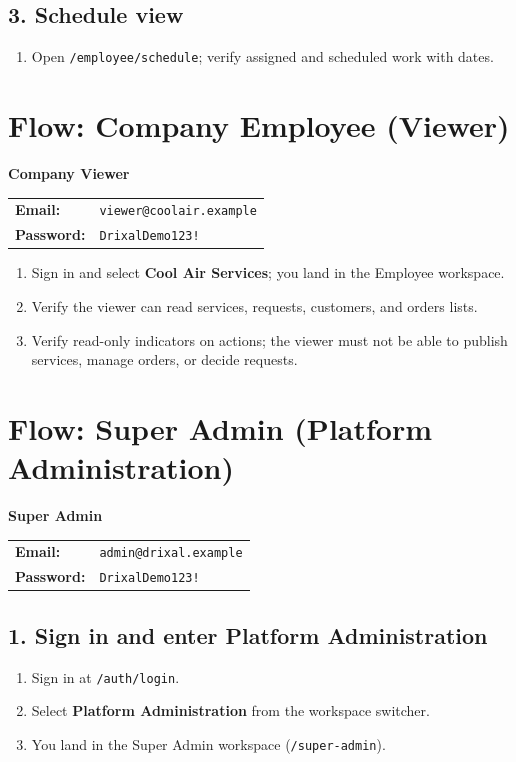 \documentclass[11pt,a4paper]{article}
\makeatletter
\newcommand{\account}[3]{%
  \begin{tcolorbox}[colback=drixalsurface, colframe=drixalblue, boxrule=0.8pt, left=10pt, right=10pt, top=8pt, bottom=8pt, breakable]
    \textbf{\color{drixalblue}#1}\\
    \begin{tabular}{@{}ll}
      \textbf{Email:} & \texttt{#2} \\
      \textbf{Password:} & \texttt{#3} \\
    \end{tabular}
  \end{tcolorbox}
}
\makeatother
\begin{document}
\subsection{3. Schedule view}
\begin{enumerate}[leftmargin=2em, itemsep=2pt]
  \item Open \texttt{/employee/schedule}; verify assigned and scheduled work with dates.
\end{enumerate}

\section{Flow: Company Employee (Viewer)}
\label{sec:flow-viewer}

\account{Company Viewer}{viewer@coolair.example}{DrixalDemo123!}

\begin{enumerate}[leftmargin=2em, itemsep=2pt]
  \item Sign in and select \textbf{Cool Air Services}; you land in the Employee workspace.
  \item Verify the viewer can read services, requests, customers, and orders lists.
  \item Verify read-only indicators on actions; the viewer must not be able to publish services, manage orders, or decide requests.
\end{enumerate}

\section{Flow: Super Admin (Platform Administration)}
\label{sec:flow-superadmin}

\account{Super Admin}{admin@drixal.example}{DrixalDemo123!}

\subsection{1. Sign in and enter Platform Administration}
\begin{enumerate}[leftmargin=2em, itemsep=2pt]
  \item Sign in at \texttt{/auth/login}.
  \item Select \textbf{Platform Administration} from the workspace switcher.
  \item You land in the Super Admin workspace (\texttt{/super-admin}).
\end{enumerate}
\end{document}
